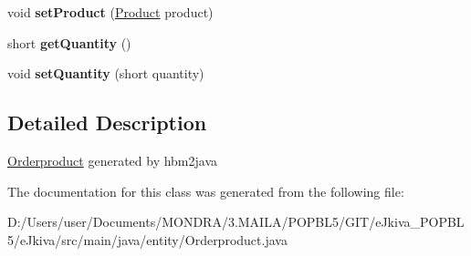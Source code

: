 \begin{DoxyCompactItemize}
void {\bfseries set\+Product} (\mbox{\hyperlink{classentity_1_1_product}{Product}} product)
\item 
\mbox{\label{classentity_1_1_orderproduct_a4a10cb8ecd7ac4c692f5f3fa96793e9d}} 
short {\bfseries get\+Quantity} ()
\item 
\mbox{\label{classentity_1_1_orderproduct_ab402591f6605ff9ad60a62175b4e6d0d}} 
void {\bfseries set\+Quantity} (short quantity)
\end{DoxyCompactItemize}


\subsection{Detailed Description}
\mbox{\hyperlink{classentity_1_1_orderproduct}{Orderproduct}} generated by hbm2java 

The documentation for this class was generated from the following file\+:\begin{DoxyCompactItemize}
\item 
D\+:/\+Users/user/\+Documents/\+M\+O\+N\+D\+R\+A/3.\+M\+A\+I\+L\+A/\+P\+O\+P\+B\+L5/\+G\+I\+T/e\+Jkiva\+\_\+\+P\+O\+P\+B\+L5/e\+Jkiva/src/main/java/entity/Orderproduct.\+java\end{DoxyCompactItemize}
